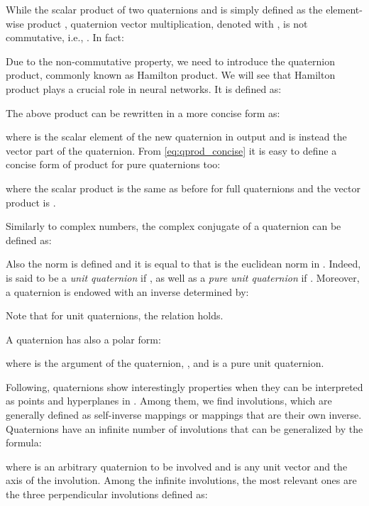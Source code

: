 \documentclass[graybox]{svmult}
\begin{document}
While the scalar product of two quaternions  and  is simply defined as the element-wise product , quaternion vector multiplication, denoted with , is not commutative, i.e., . In fact:



Due to the non-commutative property, we need to introduce the quaternion product, commonly known as Hamilton product. We will see that Hamilton product plays a crucial role in neural networks. It is defined as:



The above product can be rewritten in a more concise form as:



\noindent where  is the scalar element of the new quaternion in output and  is instead the vector part of the quaternion. From \eqref{eq:qprod_concise} it is easy to define a concise form of product for pure quaternions too:



\noindent where the scalar product is the same as before for full quaternions and the vector product is . 

Similarly to complex numbers, the complex conjugate of a quaternion can be defined as:



\noindent Also the norm is defined and it is equal to  that is the euclidean norm in . Indeed,  is said to be a \textit{unit quaternion} if , as well as a \textit{pure unit quaternion} if . Moreover, a quaternion  is endowed with an inverse determined by:



\noindent Note that for unit quaternions, the relation  holds.

A quaternion has also a polar form: 


 
\noindent where  is the argument of the quaternion, ,   and  is a pure unit quaternion.

Following, quaternions show interestingly properties when they can be interpreted as points and hyperplanes in . Among them, we find involutions, which are generally defined as self-inverse mappings or mappings that are their own inverse.
Quaternions have an infinite number of involutions \cite{ELL2007137} that can be generalized by the formula:



\noindent where  is an arbitrary quaternion to be involved and  is any unit vector and the axis of the involution. Among the infinite involutions, the most relevant ones are the three perpendicular involutions defined as:
\end{document}
